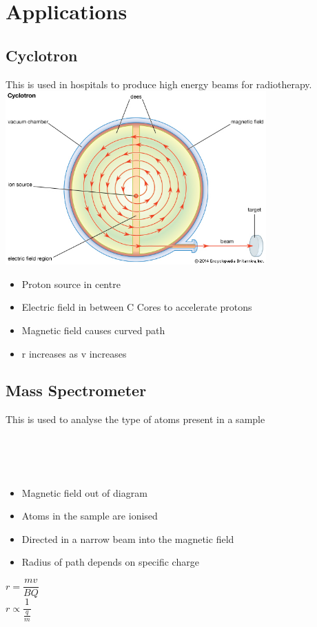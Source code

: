 \documentclass{article}[18pt]
\begin{document}
\section{Applications}
\subsection{Cyclotron}
This is used in hospitals to produce high energy beams for radiotherapy.\\
\includegraphics[width=10cm]{cyclotron.jpg}\\
\begin{itemize}
\item Proton source in centre
\item Electric field in between C Cores to accelerate protons
\item Magnetic field causes curved path
\item r increases as v increases
\end{itemize}
\subsection{Mass Spectrometer}
This is used to analyse the type of atoms present in a sample\\
\\
\\
\\
\begin{itemize}
\item Magnetic field out of diagram
\item Atoms in the sample are ionised
\item Directed in a narrow beam into the magnetic field
\item Radius of path depends on specific charge
\end{itemize}
$r=\dfrac{mv}{BQ}$\\
$r\propto\dfrac{1}{\frac{q}{m}}$
\end{document}
